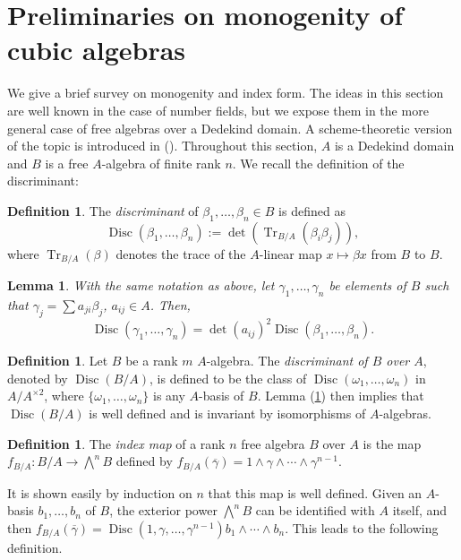 \documentclass[oneside]{amsart}
\DeclareMathOperator{\disc}{Disc}
\DeclareMathOperator{\tr}{Tr}
\newtheorem{lemma}[X]{Lemma}
\theoremstyle{definition}
\newtheorem{definition}[X]{Definition}
\begin{document}
\section{Preliminaries on monogenity of cubic algebras}
\label{section: preliminaries}
We give a brief survey on monogenity and index form. The ideas in this section are well known in the case of number fields, but we expose them in the more general case of free algebras over a Dedekind domain.   A scheme-theoretic version of the topic is introduced in  (\cite[Def. 1.2]{ArpinI}). Throughout this section, $A$ is a Dedekind domain and $B$ is a  free $A$-algebra of finite rank $n$. We recall the definition of the discriminant: 

\begin{definition}{\cite[pp. 31,32]{milneANT}} The \textit{discriminant} of  $\beta_1, \dots, \beta_n\in B$ is defined as
    $$
    \disc(\beta_1,\dots,\beta_n) := \det(\tr_{B/A}(\beta_i\beta_j)),
    $$
    where $\tr_{B/A}(\beta)$ denotes the trace of  the $A$-linear map 
    $x \mapsto \beta x$ from $B$ to $B$. 
\end{definition}
\begin{lemma}{\cite[Lem. 2.23]{milneANT}}
    \label{lemma: disc of elements}
    With the same notation as above, let $\gamma_1,\dots, \gamma_n$ be elements of $B$ such that $\gamma_j = \sum a_{ji}\beta_j$, $a_{ij} \in A$. Then, 
    $$
    \disc(\gamma_1,\dots,\gamma_n) = \det(a_{ij})^2\disc(\beta_1,\dots,\beta_n).
    $$
\end{lemma}
\begin{definition}{\cite[p. 33]{milneANT}}
    Let $B$ be a rank $m$ $A$-algebra. The \textit{discriminant of $B$ over $A$}, denoted by $\disc(B/A)$, is defined to be the class of $\disc(\omega_1,\dots,\omega_n)$ in $A/A^{\times 2}$, where $\{\omega_1,\dots,\omega_n\}$ is any $A$-basis of $B$. Lemma (\ref{lemma: disc of elements}) then implies that $\disc(B/A)$ is well defined and is invariant by isomorphisms of $A$-algebras.
\end{definition}

\begin{definition}
    The \textit{index map} of a rank $n$ free algebra $B$ over $A$ is the map $f_{B/A}:B/A \to \bigwedge^n B$ defined by $f_{B/A}(\overline{\gamma}) = 1\wedge \gamma \wedge \cdots \wedge \gamma^{n - 1}$.
\end{definition}
It is shown easily by induction on $n$ that this map is well defined. Given an $A$-basis $b_1,\dots, b_n$ of $B$, the exterior power $\bigwedge^n B$ can be identified with $A$ itself, and then $f_{B/A}(\overline{\gamma})=\operatorname{Disc}(1,\gamma,\dots,\gamma^{n-1}) b_1\wedge\cdots\wedge b_n$. This leads to the following definition.
\end{document}
